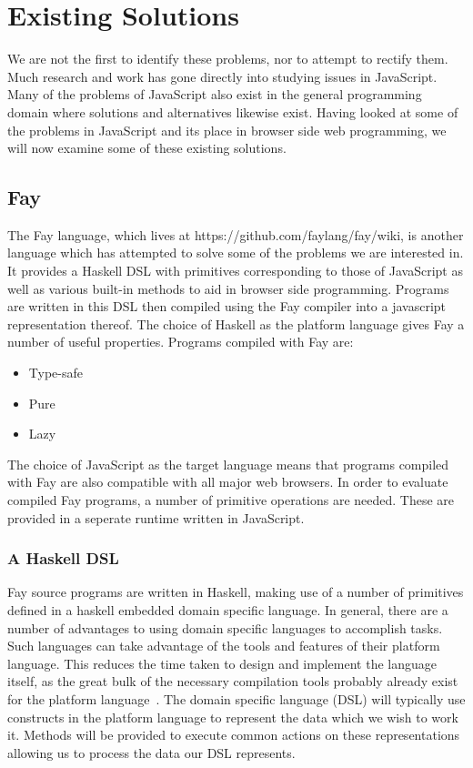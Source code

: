 
\section{Existing Solutions}
We are not the first to identify these problems, nor to attempt
to rectify them. Much research and work has gone directly into studying
issues in JavaScript. Many of the problems of JavaScript also exist
in the general programming domain where solutions and alternatives
likewise exist. Having looked at some of the problems in JavaScript 
and its place in browser side web programming, we will now examine
some of these existing solutions.


\subsection{Fay}
The Fay language, which lives at https://github.com/faylang/fay/wiki, is
another language which has attempted to solve some of the problems we
are interested in. It provides a Haskell DSL with primitives corresponding
to those of JavaScript as well as various built-in methods to aid in browser
side programming. Programs are written in this DSL then compiled using the
Fay compiler into a javascript representation thereof. The choice of Haskell
as the platform language gives Fay a number of useful properties. Programs 
compiled with Fay are:

\begin{itemize}
	\item Type-safe
	\item Pure
	\item Lazy
\end{itemize}

\noindent The choice of JavaScript as the target language means that programs
compiled with Fay are also compatible with all major web browsers. In order
to evaluate compiled Fay programs, a number of primitive operations
are needed. These are provided in a seperate runtime written in JavaScript.

\subsubsection{A Haskell DSL}
Fay source programs are written in Haskell, making use of a number of
primitives defined in a haskell embedded domain specific language.
In general, there are a number of advantages to using domain specific languages
to accomplish tasks. Such languages can take advantage of the tools and 
features of their platform language. This reduces the time taken to
design and implement the language itself, as the great bulk of the necessary
compilation tools probably already exist for the platform language~\cite{DSLs}. 
The domain specific language (DSL) will typically use constructs in the
platform language to represent the data which we wish to work it. Methods
will be provided to execute common actions on these representations allowing
us to process the data our DSL represents. 

